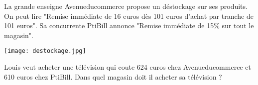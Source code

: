  
La grande enseigne Avenueducommerce propose un déstockage sur ses produits. On peut lire "Remise immédiate de 16 euros dès 101 euros d'achat par tranche de 101 euros".
Sa concurrente PtiBill annonce "Remise immédiate de 15\% sur tout le magasin".


\texttt{[image: destockage.jpg]} 



Louis veut acheter une télévision qui coute 624 euros chez Avenueducommerce et 610 euros chez PtiBill. Dans quel magasin doit il acheter sa télévision ?
 
